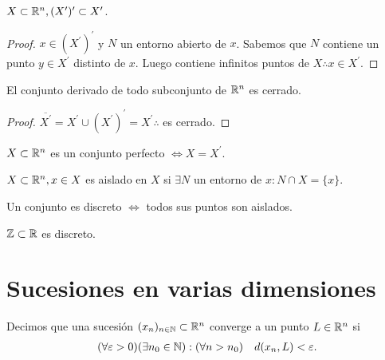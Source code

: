 \begin{prop}
  $X \subset \mathbb{R}^n, (X^{\prime})^{\prime} \subset X^{\prime}$.
  \begin{proof}
    $x \in (X^{\prime})^{\prime}$ y $N$ un entorno abierto de $x$. Sabemos que $N$ contiene un punto $y \in X^{\prime}$ distinto de $x$. Luego contiene infinitos puntos de $X \therefore x \in X^{\prime}$.
  \end{proof}
\end{prop}

\begin{corollary}
  El conjunto derivado de todo subconjunto de $\mathbb{R}^n$ es cerrado.
  \begin{proof}
    $\overline{X^{\prime}} = X^{\prime} \cup (X^{\prime})^{\prime} = X^{\prime} \therefore$ es cerrado.
  \end{proof}
\end{corollary}

\begin{definition}
  $X \subset \mathbb{R}^n$ es un conjunto perfecto $\iff X = X^{\prime}$.
\end{definition}

\begin{definition}
  $X \subset \mathbb{R}^n, x \in X$ es aislado en $X$ si $\exists N$ un entorno de $x : N \cap X = \{x\}$.
\end{definition}

\begin{definition}
  Un conjunto es discreto $\iff$ todos sus puntos son aislados.
\end{definition}

\begin{eg}
  $\mathbb{Z} \subset \mathbb{R}$ es discreto.
\end{eg}

\section{Sucesiones en varias dimensiones}

Decimos que una sucesión $(x_n)_{n \in \mathbb{N}} \subset \mathbb{R}^n$ converge a un punto $L \in \mathbb{R}^n$ si \begin{align*}
  (\forall \varepsilon > 0)(\exists n_0 \in \mathbb{N}) : (\forall n > n_0) \quad d(x_n, L) < \varepsilon.
\end{align*}

